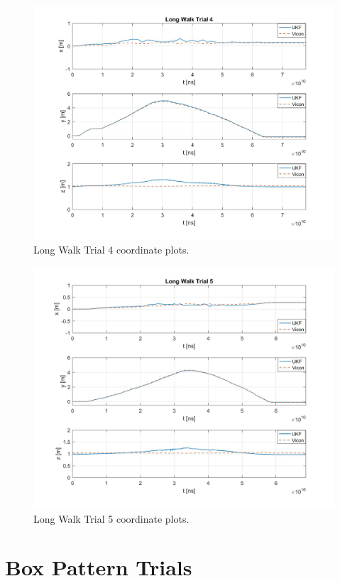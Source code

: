 \begin{figure}
  \centering
    \includegraphics[width=\textwidth]{longWalk4_xyz}
  \caption[Long Walk Trial 4]{Long Walk Trial 4 coordinate plots.}
  \label{fig:longWalk4_xyz}
\end{figure}

\begin{figure}
  \centering
    \includegraphics[width=\textwidth]{longWalk5_xyz}
  \caption[Long Walk Trial 5]{Long Walk Trial 5 coordinate plots.}
  \label{fig:longWalk5_xyz}
\end{figure}

\section{Box Pattern Trials}


